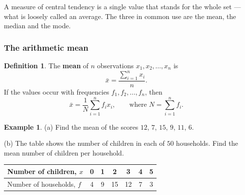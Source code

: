 \documentclass[11pt,a4paper]{article}
\theoremstyle{definition}
\newtheorem{definition}[thm]{Definition}
\newtheorem{example}[thm]{Example}
\begin{document}
A measure of central tendency is a single value that stands for the whole set --- what
is loosely called an average. The three in common use are the mean, the median and the
mode.

\subsubsection{The arithmetic mean}

\begin{definition}
The \textbf{mean} of $n$ observations $x_1,x_2,\ldots,x_n$ is
$$\bar{x}=\frac{\sum_{i=1}^{n}x_i}{n}.$$
If the values occur with frequencies $f_1,f_2,\ldots,f_n$, then
$$\bar{x}=\frac{1}{N}\sum_{i=1}^{n}f_ix_i,\qquad\text{where } N=\sum_{i=1}^{n}f_i.$$
\end{definition}

\begin{example}
(a) Find the mean of the scores $12$, $7$, $15$, $9$, $11$, $6$.

(b) The table shows the number of children in each of $50$ households. Find the mean
number of children per household.

\begin{table}[H]
\centering
\begin{tabular}{|l|c|c|c|c|c|c|}
\hline
Number of children, $x$ & 0 & 1 & 2 & 3 & 4 & 5\\
\hline
Number of households, $f$ & 4 & 9 & 15 & 12 & 7 & 3\\
\hline
\end{tabular}
\end{table}
\end{example}
\end{document}

